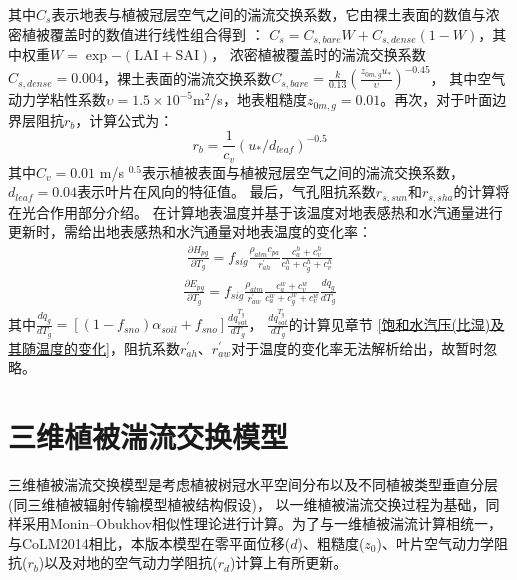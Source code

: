 其中$C_s$表示地表与植被冠层空气之间的湍流交换系数，它由裸土表面的数值与浓密植被覆盖时的数值进行线性组合得到 \citep{zeng2005vegetation}：
$C_s=C_{s,bare}W+C_{s,dense}\left(1-W\right)$，其中权重$W=\exp {-\left(\text{LAI}+\text{SAI}\right)}$，
浓密植被覆盖时的湍流交换系数$C_{s,dense}=0.004$，裸土表面的湍流交换系数$C_{s,bare}=\frac{k}{0.13}\left(\frac{z_{0m,g}u_\ast}{\upsilon}\right)^{-0.45}$，
其中空气动力学粘性系数$\upsilon=1.5\times{10}^{-5}$m$^2$/s，地表粗糙度$z_{0m,g}=0.01$。再次，对于叶面边界层阻抗$r_b$，计算公式为：
\begin{equation}
r_{b}=\frac{1}{c_{v}}\left(u_{*} / d_{{leaf }}\right)^{-0.5}
\end{equation}
其中$C_v=0.01$ m/s $^{0.5}$表示植被表面与植被冠层空气之间的湍流交换系数，$d_{leaf}=0.04$表示叶片在风向的特征值。
最后，气孔阻抗系数$r_{s,sun}$和$r_{s,sha}$的计算将在光合作用部分介绍。
在计算地表温度并基于该温度对地表感热和水汽通量进行更新时，需给出地表感热和水汽通量对地表温度的变化率：
\begin{equation}
\begin{array}{c} \frac{\partial H_{p g}}{\partial T_{g}}=f_{sig} \frac{\rho_{atm} c_{p a}}{r_{a h}^{\prime}} 
     \frac{c_{a}^{h}+c_{v}^{h}}{c_{a}^{h}+c_{g}^{h}+c_{v}^{h}}\end{array}
\end{equation}
\begin{equation}
\begin{array}{c}\frac{\partial E_{p g}}{\partial T_{g}}=f_{sig}
      \frac{\rho_{atm}}{r_{a w}^{\prime}} \frac{c_{a}^{w}+c_{v}^{w}}{c_{a}^{w}+c_{g}^{w}+c_{v}^{w}} \frac{d q_{g}}{d T_{g}}\end{array}
\end{equation}
其中$\frac{dq_g}{dT_g}=\left[\left(1-f_{sno}\right)\alpha_{soil}+f_{sno}\right]\frac{dq_{sat}^{T_g}}{dT_g}$，
$\frac{dq_{sat}^{T_g}}{dT_g}$的计算见章节 \ref{饱和水汽压(比湿)及其随温度的变化}，阻抗系数$r_{ah}^\prime$、$r_{aw}^\prime$对于温度的变化率无法解析给出，故暂时忽略。


\section{三维植被湍流交换模型}
三维植被湍流交换模型是考虑植被树冠水平空间分布以及不同植被类型垂直分层(同三维植被辐射传输模型植被结构假设)，
以一维植被湍流交换过程为基础，同样采用Monin–Obukhov相似性理论进行计算。为了与一维植被湍流计算相统一，
与CoLM2014相比，本版本模型在零平面位移($d$)、粗糙度($z_0$)、叶片空气动力学阻抗($r_b$)以及对地的空气动力学阻抗($r_d$)计算上有所更新。
